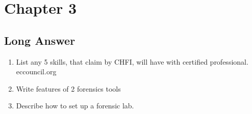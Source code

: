 \section{Chapter 3}
\subsection{Long Answer}
\begin{enumerate}
    \item List any 5 skills, that claim by CHFI, will have with certified professional.\\eccouncil.org
    \item Write features of 2 forensics tools
    \item Describe how to set up a forensic lab.
\end{enumerate}


